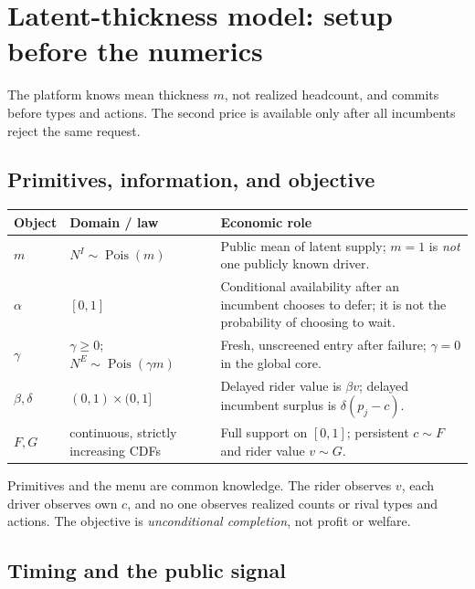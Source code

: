 \documentclass[11pt]{article}
\newcommand{\takeaway}[1]{\par\smallskip\noindent #1\par\smallskip}
\begin{document}
\clearpage
\section{Latent-thickness model: setup before the numerics}

\begingroup\small
\takeaway{The platform knows mean thickness $m$, not realized headcount, and
commits before types and actions.  The second price is available only after all
incumbents reject the same request.}

\subsection{Primitives, information, and objective}

\begin{center}
\scriptsize
\begin{tabularx}{.99\textwidth}{@{}L{1.0cm}L{2.8cm}X@{}}
\toprule
Object & Domain / law & Economic role\\
\midrule
$m$ & $N^I\sim\operatorname{Pois}(m)$ & Public mean of latent supply;
$m=1$ is \emph{not} one publicly known driver.\\
$\alpha$ & $[0,1]$ & Conditional availability after an incumbent chooses to
defer; it is not the probability of choosing to wait.\\
$\gamma$ & $\gamma\ge0$; $N^E\sim\operatorname{Pois}(\gamma m)$ & Fresh,
unscreened entry after
failure; $\gamma=0$ in the global core.\\
$\beta,\delta$ & $(0,1)\times(0,1]$ & Delayed rider value is $\beta v$; delayed
incumbent surplus is $\delta(p_j-c)$.\\
$F,G$ & continuous, strictly increasing CDFs & Full support on $[0,1]$;
persistent $c\sim F$ and rider value $v\sim G$.\\
\bottomrule
\end{tabularx}
\end{center}
\vspace{-4pt}

\noindent Primitives and the menu are common knowledge.  The rider observes
$v$, each driver observes own $c$, and no one observes realized counts or rival
types and actions.  The objective is \emph{unconditional completion}, not
profit or welfare.

\subsection{Timing and the public signal}
\end{document}
